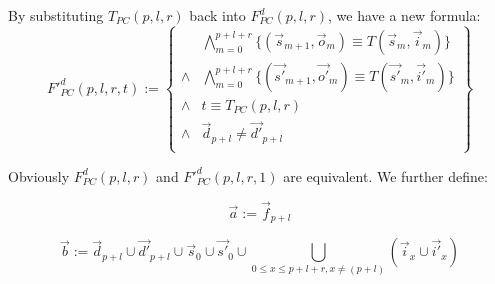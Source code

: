 \documentclass[runningheads,a4paper,orivec]{llncs}
\begin{document}
By substituting $T_{PC}(p,l,r)$ back into $F^d_{PC}(p,l,r)$,
we have a new formula:
\begin{equation}\label{fpcq}
F'^d_{PC}(p,l,r,t):=
\left\{
\begin{array}{cc}
&\bigwedge_{m=0}^{p+l+r}
\{
(\vec{s}_{m+1},\vec{o}_m)\equiv T(\vec{s}_m,\vec{i}_m)
\}
\\
\wedge&\bigwedge_{m=0}^{p+l+r}
\{
(\vec{s'}_{m+1},\vec{o'}_m)\equiv T(\vec{s'}_m,\vec{i'}_m)
\}
\\
\wedge& t\equiv T_{PC}(p,l,r)\\
\wedge& \vec{d}_{p+l}\ne \vec{d'}_{p+l} \\
\end{array}
\right\}
\end{equation}


Obviously $F^d_{PC}(p,l,r)$ and $F'^d_{PC}(p,l,r,1)$ are equivalent.
We further define:

% 


\begin{equation}\label{pcdef1}
\vec{a}:=\vec{f}_{p+l}
\end{equation}

\begin{equation}\label{pcdef2}
\vec{b}:=\vec{d}_{p+l}\cup \vec{d'}_{p+l}\cup \vec{s}_0\cup \vec{s'}_0\cup\bigcup_{0\le x\le p+l+r,x\neq (p+l)}(\vec{i}_{x}\cup\vec{i'}_{x})
\end{equation}
\end{document}
